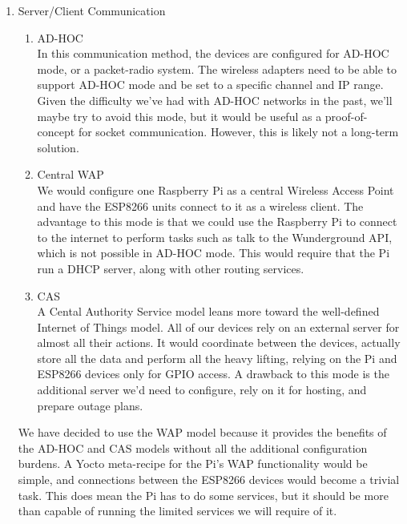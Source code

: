 \documentclass[12pt]{article}
\begin{document}
\begin{enumerate}
    \item Server/Client Communication
        \begin{enumerate}
            \item AD-HOC \\
            In this communication method, the devices are configured for AD-HOC mode, or a packet-radio system. The wireless adapters need to be able to support AD-HOC mode and be set to a specific channel and IP range. Given the difficulty we've had with AD-HOC networks in the past, we'll maybe try to avoid this mode, but it would be useful as a proof-of-concept for socket communication. However, this is likely not a long-term solution.
            \item Central WAP \\
            We would configure one Raspberry Pi as a central Wireless Access Point and have the ESP8266 units connect to it as a wireless client. The advantage to this mode is that we could use the Raspberry Pi to connect to the internet to perform tasks such as talk to the Wunderground API, which is not possible in AD-HOC mode. This would require that the Pi run a DHCP server, along with other routing services.
            \item CAS \\
            A Cental Authority Service model leans more toward the well-defined Internet of Things model. All of our devices rely on an external server for almost all their actions. It would coordinate between the devices, actually store all the data and perform all the heavy lifting, relying on the Pi and ESP8266 devices only for GPIO access. A drawback to this mode is the additional server we'd need to configure, rely on it for hosting, and prepare outage plans.
        \end{enumerate}
        We have decided to use the WAP model because it provides the benefits of the AD-HOC and CAS models without all the additional configuration burdens. A Yocto meta-recipe for the Pi's WAP functionality would be simple, and connections between the ESP8266 devices would become a trivial task. This does mean the Pi has to do some services, but it should be more than capable of running the limited services we will require of it.
\end{enumerate}
    
\end{document}
